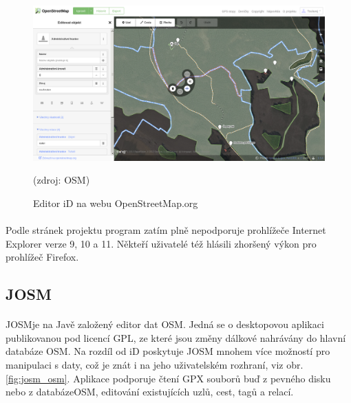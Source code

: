 \documentclass[11pt,a4paper,titlepage,oneside]{book}
\begin{document}
		\begin{figure}[!h]
			\begin{center}
				\includegraphics[width=12cm]{obrazky/iD_osm.png}
				\caption{Editor iD na webu OpenStreetMap.org} (zdroj: \ac{OSM}\cite{osm_edit})
				\label{fig:iD_osm}
			\end{center}
		\end{figure}

			\paragraph{} Podle stránek projektu\cite{wiki_iD} program zatím plně nepodporuje prohlížeče Internet Explorer verze 9, 10 a 11. Někteří uživatelé též hlásili zhoršený výkon pro prohlížeč Firefox.

		\subsection{JOSM}
			\paragraph{}\ac{JOSM}je na Javě založený editor dat \ac{OSM}. Jedná se o desktopovou aplikaci publikovanou pod licencí \ac{GPL}, ze které jsou změny dálkové nahrávány do hlavní databáze \ac{OSM}\cite{wiki_josm}. Na rozdíl od iD poskytuje JOSM mnohem více možností pro manipulaci s daty\cite{wiki_comparison}, což je znát i na jeho uživatelském rozhraní, viz obr. \ref{fig:josm_osm}. Aplikace podporuje čtení \ac{GPX} souborů buď z pevného disku nebo z databáze\acl{OSM}, editování existujících uzlů, cest, tagů a relací.

\end{document}
